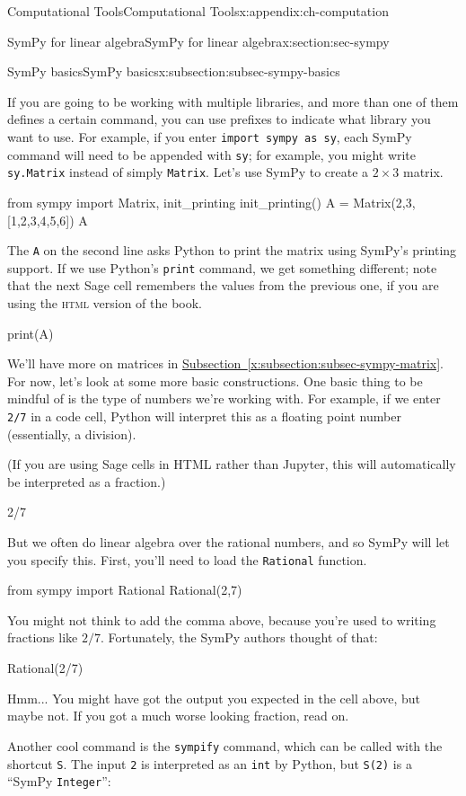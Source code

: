 \documentclass[oneside,10pt,]{book}
\newcommand{\xreffont}{\relax}
\newcommand{\mono}[1]{\texttt{#1}}
\newcommand{\initialism}[1]{\textsc{\MakeLowercase{#1}}}
\numberwithin{equation}{section}
\begin{document}
\begin{appendixptx}{Computational Tools}{}{Computational Tools}{}{}{x:appendix:ch-computation}
\begin{sectionptx}{SymPy for linear algebra}{}{SymPy for linear algebra}{}{}{x:section:sec-sympy}
\begin{subsectionptx}{SymPy basics}{}{SymPy basics}{}{}{x:subsection:subsec-sympy-basics}
\par
If you are going to be working with multiple libraries, and more than one of them defines a certain command, you can use prefixes to indicate what library you want to use. For example, if you enter \mono{import sympy as sy}, each SymPy command will need to be appended with \mono{sy}; for example, you might write \mono{sy.Matrix} instead of simply \mono{Matrix}. Let's use SymPy to create a \(2\times 3\) matrix.%
\begin{sageinput}
from sympy import Matrix, init_printing
init_printing()
A = Matrix(2,3,[1,2,3,4,5,6])
A
\end{sageinput}
The \mono{A} on the second line asks Python to print the matrix using SymPy's printing support. If we use Python's \mono{print} command, we get something different; note that the next Sage cell remembers the values from the previous one, if you are using the \initialism{HTML} version of the book.%
\begin{sageinput}
print(A)
\end{sageinput}
We'll have more on matrices in \hyperref[x:subsection:subsec-sympy-matrix]{Subsection~{\xreffont\ref{x:subsection:subsec-sympy-matrix}}}. For now, let's look at some more basic constructions. One basic thing to be mindful of is the type of numbers we're working with. For example, if we enter \mono{2/7} in a code cell, Python will interpret this as a floating point number (essentially, a division).%
\par
(If you are using Sage cells in HTML rather than Jupyter, this will automatically be interpreted as a fraction.)%
\begin{sageinput}
2/7
\end{sageinput}
But we often do linear algebra over the rational numbers, and so SymPy will let you specify this. First, you'll need to load the \mono{Rational} function.%
\begin{sageinput}
from sympy import Rational
Rational(2,7)
\end{sageinput}
You might not think to add the comma above, because you're used to writing fractions like \(2/7\). Fortunately, the SymPy authors thought of that:%
\begin{sageinput}
Rational(2/7)
\end{sageinput}
Hmm... You might have got the output you expected in the cell above, but maybe not. If you got a much worse looking fraction, read on.%
\par
Another cool command is the \mono{sympify} command, which can be called with the shortcut \mono{S}. The input \mono{2} is interpreted as an \mono{int} by Python, but \mono{S(2)} is a ``SymPy \mono{Integer}'':%

\end{subsectionptx}
\end{sectionptx}
\end{appendixptx}
\end{document}
